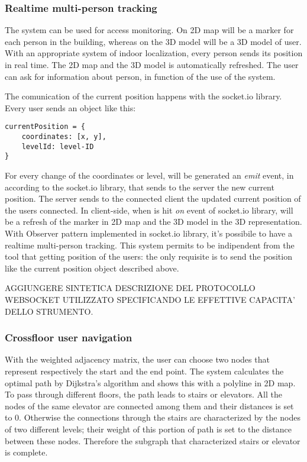 \documentclass[]{article}
\begin{document}
\subsubsection{Realtime multi-person
tracking}\label{realtime-multi-person-tracking}

The system can be used for access monitoring. On 2D map will be a marker
for each person in the building, whereas on the 3D model will be a 3D
model of user. With an appropriate system of indoor localization, every
person sends its position in real time. The 2D map and the 3D model is
automatically refreshed. The user can ask for information about person,
in function of the use of the system.

The comunication of the current position happens with the socket.io
library. Every user sends an object like this:

\begin{verbatim}
currentPosition = {
    coordinates: [x, y],
    levelId: level-ID  
}
\end{verbatim}

For every change of the coordinates or level, will be generated an
\emph{emit} event, in according to the socket.io library, that sends to
the server the new current position. The server sends to the connected
client the updated current position of the users connected. In
client-side, when is hit \emph{on} event of socket.io library, will be a
refresh of the marker in 2D map and the 3D model in the 3D
representation. With Observer pattern implemented in socket.io library,
it's possibile to have a realtime multi-person tracking. This system
permits to be indipendent from the tool that getting position of the
users: the only requisite is to send the position like the current
position object described above.

AGGIUNGERE SINTETICA DESCRIZIONE DEL PROTOCOLLO WEBSOCKET UTILIZZATO
SPECIFICANDO LE EFFETTIVE CAPACITA' DELLO STRUMENTO.

\subsubsection{Crossfloor user
navigation}\label{crossfloor-user-navigation}

With the weighted adjacency matrix, the user can choose two nodes that
represent respectively the start and the end point. The system
calculates the optimal path by Dijkstra's algorithm and shows this with
a polyline in 2D map. To pass through different floors, the path leads
to stairs or elevators. All the nodes of the same elevator are connected
among them and their distances is set to 0. Otherwise the connections
through the stairs are characterized by the nodes of two different
levels; their weight of this portion of path is set to the distance
between these nodes. Therefore the subgraph that characterized stairs or
elevator is complete.
\end{document}

